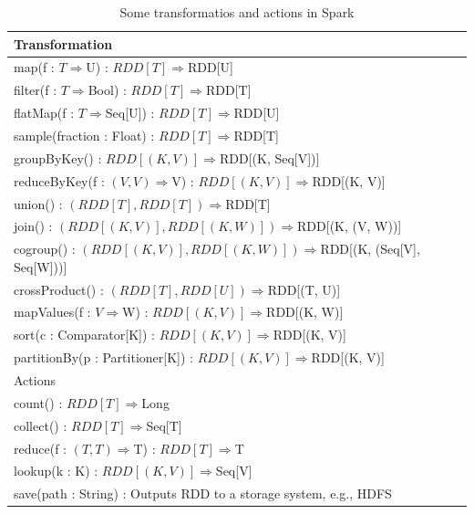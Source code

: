 \begin{table}[]
\centering
\caption{Some transformatios and actions in Spark}
\label{trans-act}
\begin{tabular}{|l|l|}
\hline
\multicolumn{2}{|l|}{Transformation}           \\ \hline
\multicolumn{2}{|l|}{map(f : $T \Rightarrow $U) : $RDD[T] \Rightarrow $RDD[U]} \\ \hline
\multicolumn{2}{|l|}{filter(f : $T \Rightarrow $Bool) : $RDD[T] \Rightarrow $RDD[T]} \\ \hline
\multicolumn{2}{|l|}{flatMap(f : $T \Rightarrow $Seq[U]) : $RDD[T] \Rightarrow $RDD[U]} \\ \hline
\multicolumn{2}{|l|}{sample(fraction : Float) : $RDD[T] \Rightarrow $RDD[T]} \\ \hline
\multicolumn{2}{|l|}{groupByKey() : $RDD[(K, V)] \Rightarrow $RDD[(K, Seq[V])]} \\ \hline
\multicolumn{2}{|l|}{reduceByKey(f : $(V, V) \Rightarrow $V) : $RDD[(K, V)] \Rightarrow $RDD[(K, V)]} \\ \hline
\multicolumn{2}{|l|}{union() : $(RDD[T], RDD[T]) \Rightarrow $RDD[T]} \\ \hline
\multicolumn{2}{|l|}{join() : $(RDD[(K, V)], RDD[(K, W)]) \Rightarrow $RDD[(K, (V, W))]} \\ \hline
\multicolumn{2}{|l|}{cogroup() : $(RDD[(K, V)], RDD[(K, W)]) \Rightarrow $RDD[(K, (Seq[V], Seq[W]))]} \\ \hline
\multicolumn{2}{|l|}{crossProduct() : $(RDD[T], RDD[U]) \Rightarrow $RDD[(T, U)]} \\ \hline
\multicolumn{2}{|l|}{mapValues(f : $V \Rightarrow $W) : $RDD[(K, V)] \Rightarrow $RDD[(K, W)]} \\ \hline
\multicolumn{2}{|l|}{sort(c : Comparator[K]) : $RDD[(K, V)] \Rightarrow $RDD[(K, V)]} \\ \hline
\multicolumn{2}{|l|}{partitionBy(p : Partitioner[K]) : $RDD[(K, V)] \Rightarrow $RDD[(K, V)]} \\ \hline
\multicolumn{2}{|l|}{Actions} \\ \hline
\multicolumn{2}{|l|}{count() : $RDD[T] \Rightarrow $Long} \\ \hline
\multicolumn{2}{|l|}{collect() : $RDD[T] \Rightarrow $Seq[T]} \\ \hline
\multicolumn{2}{|l|}{reduce(f : $(T, T) \Rightarrow $T) : $RDD[T] \Rightarrow $T} \\ \hline
\multicolumn{2}{|l|}{lookup(k : K) : $RDD[(K, V)] \Rightarrow $Seq[V]} \\ \hline
\multicolumn{2}{|l|}{save(path : String) : Outputs RDD to a storage system, e.g., HDFS} \\ \hline

\end{tabular}
\end{table}